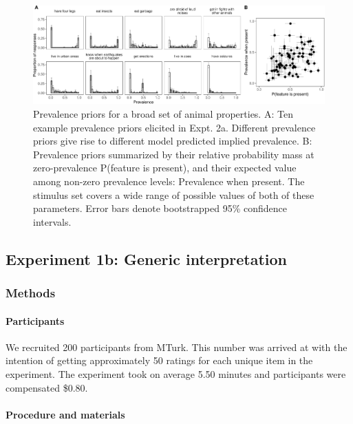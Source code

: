 \documentclass[floatsintext,doc]{apa6}
\let\oldparagraph\paragraph
\renewcommand{\paragraph}[1]{\oldparagraph{#1}\mbox{}}
\begin{document}
\begin{figure}
\centering
\includegraphics{genint_files/figure-latex/genInt-prevPrior-1.pdf}
\caption{\label{fig:genInt-prevPrior}Prevalence priors for a broad set of animal properties. A: Ten example prevalence priors elicited in Expt. 2a. Different prevalence priors give rise to different model predicted implied prevalence. B: Prevalence priors summarized by their relative probability mass at zero-prevalence P(feature is present), and their expected value among non-zero prevalence levels: Prevalence when present. The stimulus set covers a wide range of possible values of both of these parameters. Error bars denote bootstrapped 95\% confidence intervals.}
\end{figure}

\hypertarget{experiment-1b-generic-interpretation}{%
\subsection{Experiment 1b: Generic interpretation}\label{experiment-1b-generic-interpretation}}

\hypertarget{methods-1}{%
\subsubsection{Methods}\label{methods-1}}

\hypertarget{participants-2}{%
\paragraph{Participants}\label{participants-2}}

We recruited 200 participants from MTurk.
This number was arrived at with the intention of getting approximately 50 ratings for each unique item in the experiment.
The experiment took on average 5.50 minutes and participants were compensated \$0.80.

\hypertarget{procedure-and-materials-2}{%
\paragraph{Procedure and materials}\label{procedure-and-materials-2}}
\end{document}
